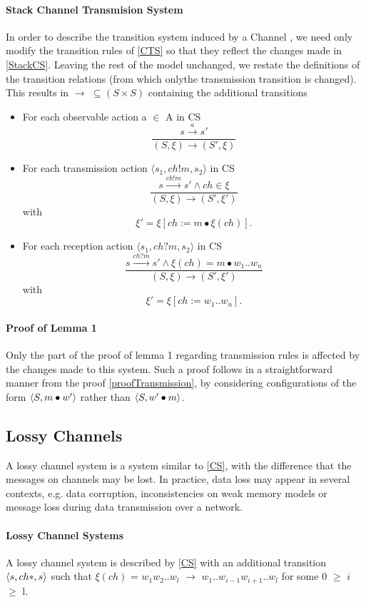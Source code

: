 \paragraph{Stack Channel Transmision System}
In order to describe the transition system induced by a Channel , we need only modify the transition rules of \ref{CTS} so that they reflect the changes made in \ref{StackCS}. Leaving the rest of the model unchanged, we restate the definitions of the transition relations (from which onlythe transmission transition is changed). This results in $\rightarrow$ $\subseteq (S \times S)$ containing the additional transitions
\begin{itemize}
    \item
      For each observable action a $\in$ A in CS
      \[
      \dfrac{s \xrightarrow{a} s'}{(S, \xi) \rightarrow (S', \xi)}
      \]
    \item
      For each transmission action $\langle s_1, ch!m, s_2 \rangle$ in CS
      \[
      \dfrac{s \xrightarrow{ch!m} s' \wedge ch \in \xi}{(S, \xi) \rightarrow (S', \xi')} \] with \[ \xi' = \xi[ch := m \bullet \xi (ch)].
      \]
    \item
      For each reception action $\langle s_1, ch?m, s_2 \rangle$ in CS
      \[
      \dfrac{s \xrightarrow{ch?m} s' \wedge \xi(ch) = m \bullet w_1..w_n}{(S, \xi) \rightarrow (S', \xi')} \] with \[ \xi' = \xi[ch:= w_1..w_n].
      \]
  \end{itemize}

\paragraph{Proof of Lemma 1}
Only the part of the proof of lemma 1 regarding transmission rules is affected by the changes made to this system. Such a proof follows in a straightforward manner from the proof \ref{proofTransmission}, by considering configurations of the form  $\langle S, m\bullet w'\rangle$ rather than $\langle S, w'\bullet m\rangle$.

\subsection{Lossy Channels}
A lossy channel system is a system similar to \ref{CS}, with the difference that the messages on channels may be lost. In practice, data loss may appear in several contexts, e.g. data corruption, inconsistencies on weak memory models or message loss during data transmission over a network.

\paragraph{Lossy Channel Systems}
A lossy channel system is described by \ref{CS} with an additional transition $\langle s, ch*, s\rangle$ such that $\xi(ch)$ = $w_1w_2..w_l$ $\rightarrow$ $w_1..w_{i-1}w_{i+1}..w_l$ for some 0 $\geq$ $i$ $\geq$ l.

